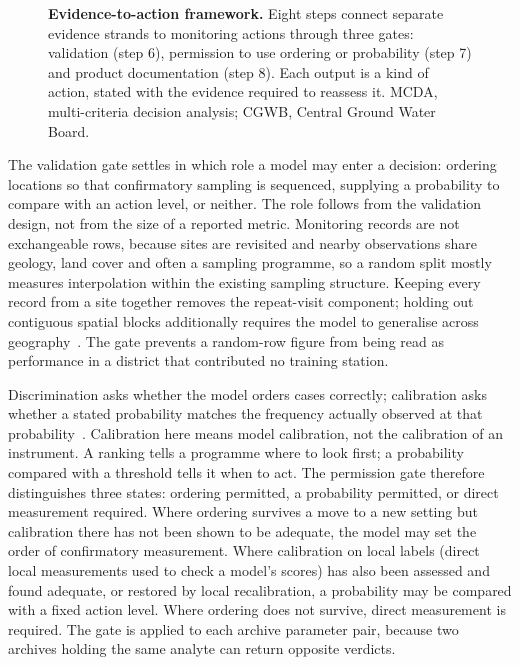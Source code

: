 \documentclass[10pt,letterpaper]{article}
\begin{document}
\begin{figure}[!ht]
\caption{\textbf{Evidence-to-action framework.} Eight steps connect separate evidence strands to monitoring actions through three gates: validation (step 6), permission to use ordering or probability (step 7) and product documentation (step 8). Each output is a kind of action, stated with the evidence required to reassess it. MCDA, multi-criteria decision analysis; CGWB, Central Ground Water Board.}
\label{fig:workflow}
\end{figure}

The validation gate settles in which role a model may enter a decision: ordering locations so that confirmatory sampling is sequenced, supplying a probability to compare with an action level, or neither. The role follows from the validation design, not from the size of a reported metric. Monitoring records are not exchangeable rows, because sites are revisited and nearby observations share geology, land cover and often a sampling programme, so a random split mostly measures interpolation within the existing sampling structure. Keeping every record from a site together removes the repeat-visit component; holding out contiguous spatial blocks additionally requires the model to generalise across geography~\cite{Meyer2019}. The gate prevents a random-row figure from being read as performance in a district that contributed no training station.

Discrimination asks whether the model orders cases correctly; calibration asks whether a stated probability matches the frequency actually observed at that probability~\cite{NiculescuMizil2005}. Calibration here means model calibration, not the calibration of an instrument. A ranking tells a programme where to look first; a probability compared with a threshold tells it when to act. The permission gate therefore distinguishes three states: ordering permitted, a probability permitted, or direct measurement required. Where ordering survives a move to a new setting but calibration there has not been shown to be adequate, the model may set the order of confirmatory measurement. Where calibration on local labels (direct local measurements used to check a model's scores) has also been assessed and found adequate, or restored by local recalibration, a probability may be compared with a fixed action level. Where ordering does not survive, direct measurement is required. The gate is applied to each archive \texttimes{} parameter pair, because two archives holding the same analyte can return opposite verdicts.
\end{document}
